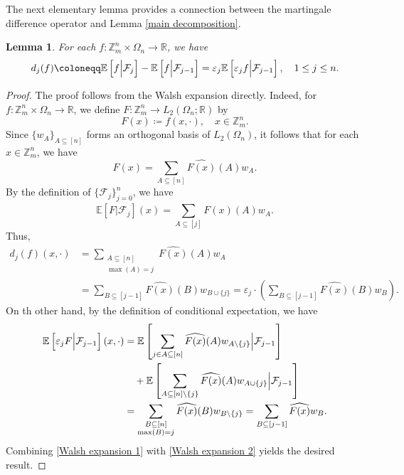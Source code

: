 \documentclass{amsart}
\numberwithin{equation}{section}
\newtheorem{lem}[thm]{Lemma}
\newcommand{\Z}{{\mathbb{Z}^{n}_{m}}}
\begin{document}
The next elementary lemma provides a connection between the martingale difference operator and Lemma \ref{main decomposition}.
\begin{lem}\label{representation of martingale difference}
For each $f:\Z\times \Omega_{n}\to \mathbb{R}$, we have
\[
d_{j}(f)\coloneqq\mathbb{E}\left[f\Big{|}\mathcal{F}_{j}\right]-\mathbb{E}\left[f\Big{|}\mathcal{F}_{j-1}\right]=\varepsilon_{j}\mathbb{E}\left[\varepsilon_{j}f\Big{|}\mathcal{F}_{j-1}\right],\quad1\leq j\leq n.
\]
\end{lem}
\begin{proof}
The proof follows from the Walsh expansion directly. Indeed, for $f:\Z\times \Omega_{n}\to \mathbb{R}$, we define $F:\Z\to L_{2}(\Omega_{n};\mathbb{R})$ by
\[
F(x)\coloneqq f(x,\cdot),\quad x\in \Z.
\]
Since $\{w_{A}\}_{A\subseteq [n]}$ forms an orthogonal basis of $L_{2}(\Omega_{n})$, it follows that for each $x\in \Z$,  we have
\[
F(x)=\sum_{A\subseteq [n]}\widehat{F(x)}(A)w_{A}.
\]
By the definition of $\{\mathcal{F}_{j}\}_{j=0}^{n}$, we have
\[
\mathbb{E}[F|\mathcal{F}_{j}](x)=\sum_{A\subseteq [j]}\widehat{F(x)}(A)w_{A}.
\]
Thus,
\begin{equation}\label{Walsh expansion 1}
\begin{split}
d_{j}(f)(x,\cdot)&=\sum_{\substack{A\subseteq [n]\\\max(A)=j}}\widehat{F(x)}(A)w_{A}\\
&=\sum_{B\subseteq [j-1]}\widehat{F(x)}(B)w_{B\cup\{j\}}=\varepsilon_{j}\cdot\left(\sum_{B\subseteq [j-1]}\widehat{F(x)}(B)w_{B}\right).
\end{split}
\end{equation}
On th other hand, by the definition of conditional expectation, we have
\begin{equation}\label{Walsh expansion 2}
\begin{split}
\mathbb{E}\left[\varepsilon_{j} F\Big{|}\mathcal{F}_{j-1}\right](x,\cdot)&=\mathbb{E}\left[\sum_{j\in A\subseteq [n]}\widehat{F(x)}(A)w_{A\setminus\{j\}}\Big{|}\mathcal{F}_{j-1}\right]\\
&\quad +\mathbb{E}\left[\sum_{A\subseteq [n]\setminus\{j\}}\widehat{F(x)}(A)w_{A\cup\{j\}}\Big{|}\mathcal{F}_{j-1}\right]\\
&=\sum_{\substack{B\subseteq[n]\\\max(B)=j}}\widehat{F(x)}(B)w_{B\setminus\{j\}}=\sum_{B\subseteq [j-1]}\widehat{F(x)}w_{B}.
\end{split}
\end{equation}
Combining \eqref{Walsh expansion 1} with \eqref{Walsh expansion 2} yields the desired result.
\end{proof}
\end{document}
